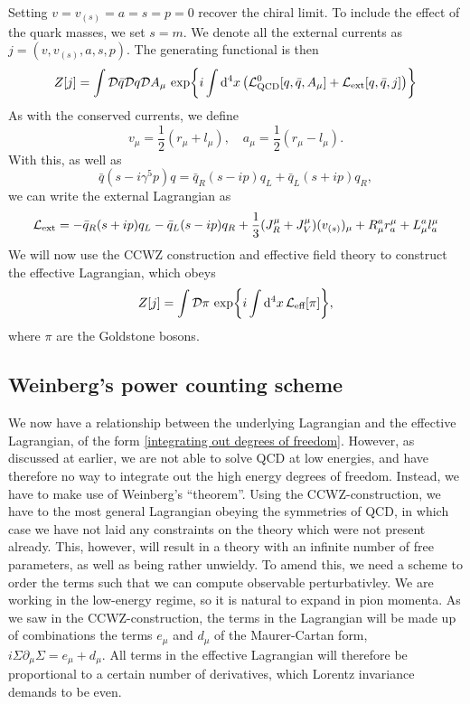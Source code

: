 Setting $v = v_{(s)} = a = s = p = 0$ recover the chiral limit.
To include the effect of the quark masses, we set $s = m$.
We denote all the external currents as $j = (v, v_{(s)}, a, s, p )$.
The generating functional is then
\begin{equation}
    Z[j] 
    = 
    \int \mathcal{D} \bar q \mathcal{D} q \mathcal{D} A_\mu \, 
    \exp{
        i \int \dd^4 x 
        \left( 
            \mathcal{L}^0_\text{QCD}[q, \bar q, A_\mu] + \mathcal{L}_\text{ext}[q, \bar q, j]
        \right)
    }
\end{equation}
As with the conserved currents, we define
\begin{equation}
    v_\mu = \frac{1}{2}(r_\mu + l_\mu),
    \quad
    a_\mu = \frac{1}{2}(r_\mu - l_\mu).
\end{equation}
With this, as well as 
\begin{equation}
    \bar q (s - i \gamma^5 p) q
    = \bar q_R (s - i p) q_L + \bar q_L (s + i p) q_R,
\end{equation}
we can write the external Lagrangian as
\begin{equation}
    \mathcal{L}_\text{ext} 
    = - \bar q_R (s + i p) q_L - \bar q_L (s - i p) q_R
    + \frac{1}{3} (J_R^\mu + J_V^\mu)(v_{(s)})_\mu
    + R_\mu^a r^\mu_a + L_\mu^a l^\mu_a
\end{equation}
We will now use the CCWZ construction and effective field theory to construct the effective Lagrangian, which obeys
\begin{equation}
    Z[j] = \int \mathcal{D} \pi \, \exp{i \int \dd^4 x \, \mathcal{L}_\text{eff}[\pi]},
\end{equation}
where $\pi$ are the Goldstone bosons.

\subsection*{Weinberg's power counting scheme}
\label{subsection:power counting}

We now have a relationship between the underlying Lagrangian and the effective Lagrangian, of the form \autoref{integrating out degrees of freedom}.
However, as discussed at earlier, we are not able to solve QCD at low energies, and have therefore no way to integrate out the high energy degrees of freedom.
Instead, we have to make use of Weinberg's ``theorem''.
Using the CCWZ-construction, we have to the most general Lagrangian obeying the symmetries of QCD, in which case we have not laid any constraints on the theory which were not present already.
This, however, will result in a theory with an infinite number of free parameters, as well as being rather unwieldy.
To amend this, we need a scheme to order the terms such that we can compute observable perturbativley.
We are working in the low-energy regime, so it is natural to expand in pion momenta.
As we saw in the CCWZ-construction, the terms in the Lagrangian will be made up of combinations the terms $e_\mu$ and $d_\mu$ of the Maurer-Cartan form, $i \Sigma \partial_\mu \Sigma = e_\mu + d_\mu$.
All terms in the effective Lagrangian will therefore be proportional to a certain number of derivatives, which Lorentz invariance demands to be even.

